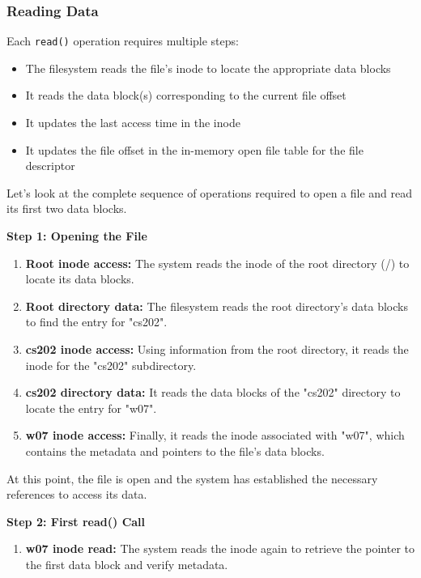 \documentclass[../../compsys.tex]{subfiles}
\begin{document}
\subsubsection{Reading Data}
Each \texttt{read()} operation requires multiple steps:
\begin{itemize}
    \item The filesystem reads the file's inode to locate the appropriate data blocks
    \item It reads the data block(s) corresponding to the current file offset
    \item It updates the last access time in the inode
    \item It updates the file offset in the in-memory open file table for the file descriptor
\end{itemize}
\newpage
\begin{example}
\leavevmode
\upshape
Let's look at the complete sequence of operations required to open a file and read its first two data blocks.

\textbf{Step 1: Opening the File}
\begin{enumerate}
    \item \textbf{Root inode access:} The system reads the inode of the root directory (/) to locate its data blocks.
    
    \item \textbf{Root directory data:} The filesystem reads the root directory's data blocks to find the entry for "cs202".
    
    \item \textbf{cs202 inode access:} Using information from the root directory, it reads the inode for the "cs202" subdirectory.
    
    \item \textbf{cs202 directory data:} It reads the data blocks of the "cs202" directory to locate the entry for "w07".
    
    \item \textbf{w07 inode access:} Finally, it reads the inode associated with "w07", which contains the metadata and pointers to the file's data blocks.
\end{enumerate}

At this point, the file is open and the system has established the necessary references to access its data.

\textbf{Step 2: First read() Call}
\begin{enumerate}
    \item \textbf{w07 inode read:} The system reads the inode again to retrieve the pointer to the first data block and verify metadata.
    

\end{enumerate}
\end{example}
\end{document}
